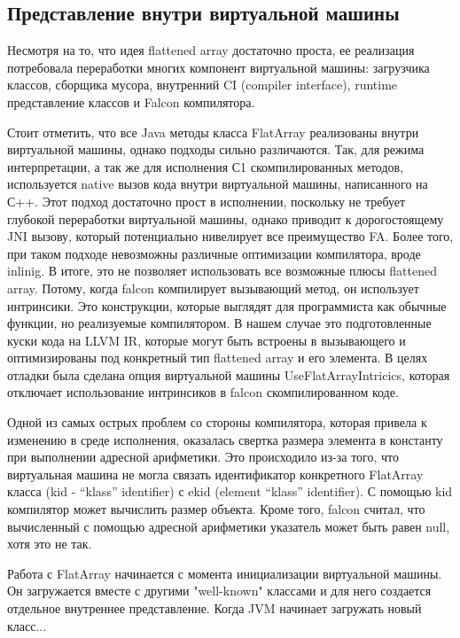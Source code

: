 \subsection{Представление внутри виртуальной машины}
Несмотря на то, что идея flattened array достаточно проста, ее реализация потребовала переработки многих компонент виртуальной машины: загрузчика классов, сборщика мусора, внутренний CI (compiler interface), runtime представление классов и Falcon компилятора.
\par 
Стоит отметить, что все Java методы класса FlatArray реализованы внутри виртуальной машины, однако подходы сильно различаются. Так, для режима интерпретации, а так же для исполнения С1 скомпилированных методов, используется native вызов кода внутри виртуальной машины, написанного на С++. Этот подход достаточно прост в исполнении, поскольку не требует глубокой переработки виртуальной машины, однако приводит к дорогостоящему JNI вызову, который потенциально нивелирует все преимущество FA. Более того, при таком подходе невозможны различные оптимизации компилятора, вроде inlinig.
В итоге, это не позволяет использовать все возможные плюсы flattened array. Потому, когда falcon компилирует вызывающий метод, он использует интринсики. Это конструкции, которые выглядят для программиста как обычные функции, но реализуемые компилятором. В нашем случае это подготовленные куски кода на LLVM IR, которые могут быть встроены в вызывающего и оптимизированы под конкретный тип flattened array и его элемента.
В целях отладки была сделана опция виртуальной машины UseFlatArrayIntricics, которая отключает использование интринсиков в falcon скомпилированном коде.   
\par
Одной из самых острых проблем со стороны компилятора, которая привела к изменению в среде исполнения, оказалась свертка размера элемента в константу при выполнении адресной арифметики. Это происходило из-за того, что виртуальная машина не могла связать идентификатор конкретного FlatArray класса (kid - “klass” identifier) с ekid (element “klass” identifier). С помощью kid компилятор может вычислить размер объекта. Кроме того, falcon считал, что вычисленный с помощью адресной арифметики указатель может быть равен null, хотя это не так. 
\par 
Работа с FlatArray начинается с момента инициализации виртуальной машины. Он загружается вместе с другими "well-known" классами и для него создается отдельное внутреннее представление. 
Когда JVM начинает загружать новый класс...

